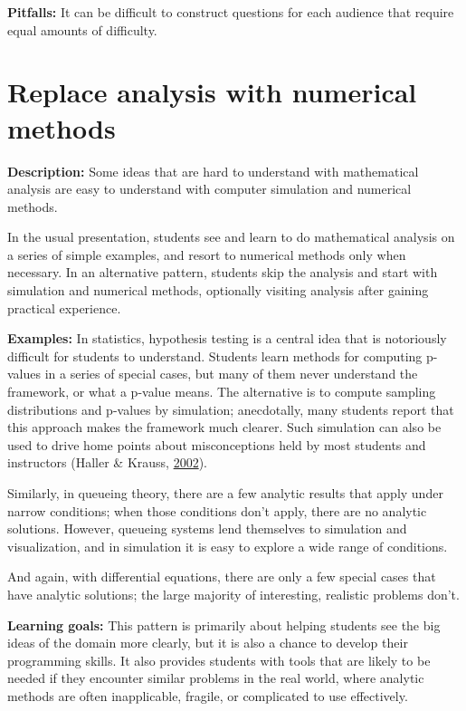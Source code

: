 \documentclass[]{book}
\begin{document}
\textbf{Pitfalls:} It can be difficult to construct questions for each
audience that require equal amounts of difficulty.\\

\section{Replace analysis with numerical
methods}\label{replace-analysis-with-numerical-methods}

\textbf{Description:} Some ideas that are hard to understand with
mathematical analysis are easy to understand with computer simulation
and numerical methods.

In the usual presentation, students see and learn to do mathematical
analysis on a series of simple examples, and resort to numerical methods
only when necessary. In an alternative pattern, students skip the
analysis and start with simulation and numerical methods, optionally
visiting analysis after gaining practical experience.

\textbf{Examples:} In statistics, hypothesis testing is a central idea
that is notoriously difficult for students to understand. Students learn
methods for computing p-values in a series of special cases, but many of
them never understand the framework, or what a p-value means. The
alternative is to compute sampling distributions and p-values by
simulation; anecdotally, many students report that this approach makes
the framework much clearer. Such simulation can also be used to drive
home points about misconceptions held by most students and instructors
(Haller \& Krauss, \protect\hyperlink{ref-HallerKrauss2002}{2002}).

Similarly, in queueing theory, there are a few analytic results that
apply under narrow conditions; when those conditions don't apply, there
are no analytic solutions. However, queueing systems lend themselves to
simulation and visualization, and in simulation it is easy to explore a
wide range of conditions.

And again, with differential equations, there are only a few special
cases that have analytic solutions; the large majority of interesting,
realistic problems don't.

\textbf{Learning goals:} This pattern is primarily about helping
students see the big ideas of the domain more clearly, but it is also a
chance to develop their programming skills. It also provides students
with tools that are likely to be needed if they encounter similar
problems in the real world, where analytic methods are often
inapplicable, fragile, or complicated to use effectively.
\end{document}

